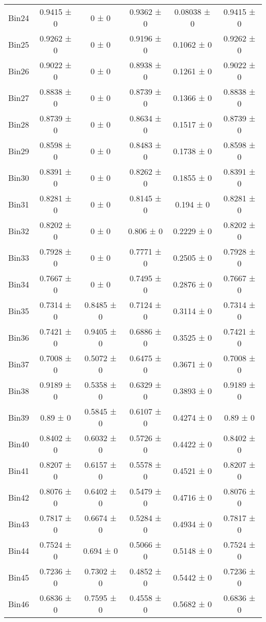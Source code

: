 \begin{tabular}{@{\extracolsep{4pt}}lccccc@{}}
     Bin24 & 0.9415 ± 0 & 0 ± 0 & 0.9362 ± 0 & 0.08038 ± 0 & 0.9415 ± 0 \\ 
     Bin25 & 0.9262 ± 0 & 0 ± 0 & 0.9196 ± 0 & 0.1062 ± 0 & 0.9262 ± 0 \\ 
     Bin26 & 0.9022 ± 0 & 0 ± 0 & 0.8938 ± 0 & 0.1261 ± 0 & 0.9022 ± 0 \\ 
     Bin27 & 0.8838 ± 0 & 0 ± 0 & 0.8739 ± 0 & 0.1366 ± 0 & 0.8838 ± 0 \\ 
     Bin28 & 0.8739 ± 0 & 0 ± 0 & 0.8634 ± 0 & 0.1517 ± 0 & 0.8739 ± 0 \\ 
     Bin29 & 0.8598 ± 0 & 0 ± 0 & 0.8483 ± 0 & 0.1738 ± 0 & 0.8598 ± 0 \\ 
     Bin30 & 0.8391 ± 0 & 0 ± 0 & 0.8262 ± 0 & 0.1855 ± 0 & 0.8391 ± 0 \\ 
     Bin31 & 0.8281 ± 0 & 0 ± 0 & 0.8145 ± 0 & 0.194 ± 0 & 0.8281 ± 0 \\ 
     Bin32 & 0.8202 ± 0 & 0 ± 0 & 0.806 ± 0 & 0.2229 ± 0 & 0.8202 ± 0 \\ 
     Bin33 & 0.7928 ± 0 & 0 ± 0 & 0.7771 ± 0 & 0.2505 ± 0 & 0.7928 ± 0 \\ 
     Bin34 & 0.7667 ± 0 & 0 ± 0 & 0.7495 ± 0 & 0.2876 ± 0 & 0.7667 ± 0 \\ 
     Bin35 & 0.7314 ± 0 & 0.8485 ± 0 & 0.7124 ± 0 & 0.3114 ± 0 & 0.7314 ± 0 \\ 
     Bin36 & 0.7421 ± 0 & 0.9405 ± 0 & 0.6886 ± 0 & 0.3525 ± 0 & 0.7421 ± 0 \\ 
     Bin37 & 0.7008 ± 0 & 0.5072 ± 0 & 0.6475 ± 0 & 0.3671 ± 0 & 0.7008 ± 0 \\ 
     Bin38 & 0.9189 ± 0 & 0.5358 ± 0 & 0.6329 ± 0 & 0.3893 ± 0 & 0.9189 ± 0 \\ 
     Bin39 & 0.89 ± 0 & 0.5845 ± 0 & 0.6107 ± 0 & 0.4274 ± 0 & 0.89 ± 0 \\ 
     Bin40 & 0.8402 ± 0 & 0.6032 ± 0 & 0.5726 ± 0 & 0.4422 ± 0 & 0.8402 ± 0 \\ 
     Bin41 & 0.8207 ± 0 & 0.6157 ± 0 & 0.5578 ± 0 & 0.4521 ± 0 & 0.8207 ± 0 \\ 
     Bin42 & 0.8076 ± 0 & 0.6402 ± 0 & 0.5479 ± 0 & 0.4716 ± 0 & 0.8076 ± 0 \\ 
     Bin43 & 0.7817 ± 0 & 0.6674 ± 0 & 0.5284 ± 0 & 0.4934 ± 0 & 0.7817 ± 0 \\ 
     Bin44 & 0.7524 ± 0 & 0.694 ± 0 & 0.5066 ± 0 & 0.5148 ± 0 & 0.7524 ± 0 \\ 
     Bin45 & 0.7236 ± 0 & 0.7302 ± 0 & 0.4852 ± 0 & 0.5442 ± 0 & 0.7236 ± 0 \\ 
     Bin46 & 0.6836 ± 0 & 0.7595 ± 0 & 0.4558 ± 0 & 0.5682 ± 0 & 0.6836 ± 0 \\ 

\end{tabular}
